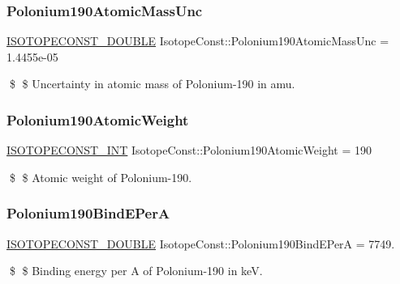 \subsubsection{\texorpdfstring{Polonium190\+Atomic\+Mass\+Unc}{Polonium190AtomicMassUnc}}
{\footnotesize\ttfamily \mbox{\hyperlink{group___isotope_const-_macros_ga8f45a7272ce02c0b4c65c44636ed719a}{I\+S\+O\+T\+O\+P\+E\+C\+O\+N\+S\+T\+\_\+\+D\+O\+U\+B\+LE}} Isotope\+Const\+::\+Polonium190\+Atomic\+Mass\+Unc = 1.\+4455e-\/05}

\$ \$ Uncertainty in atomic mass of Polonium-\/190 in amu. \mbox{\label{group___isotope_const-_polonium-_po190_gaa77be234985cdba458a5e5307aacf633}} 
\subsubsection{\texorpdfstring{Polonium190\+Atomic\+Weight}{Polonium190AtomicWeight}}
{\footnotesize\ttfamily \mbox{\hyperlink{group___isotope_const-_macros_ga5f18360b3e99483a35c32d789e62621c}{I\+S\+O\+T\+O\+P\+E\+C\+O\+N\+S\+T\+\_\+\+I\+NT}} Isotope\+Const\+::\+Polonium190\+Atomic\+Weight = 190}

\$ \$ Atomic weight of Polonium-\/190. \mbox{\label{group___isotope_const-_polonium-_po190_ga017fe89f2f6946d7bbc95e52de9bb2f5}} 
\subsubsection{\texorpdfstring{Polonium190\+Bind\+E\+PerA}{Polonium190BindEPerA}}
{\footnotesize\ttfamily \mbox{\hyperlink{group___isotope_const-_macros_ga8f45a7272ce02c0b4c65c44636ed719a}{I\+S\+O\+T\+O\+P\+E\+C\+O\+N\+S\+T\+\_\+\+D\+O\+U\+B\+LE}} Isotope\+Const\+::\+Polonium190\+Bind\+E\+PerA = 7749.}

\$ \$ Binding energy per A of Polonium-\/190 in keV. \mbox{\label{group___isotope_const-_polonium-_po190_gaddc4eb1271788833b5ae845c4eb16b33}} 

